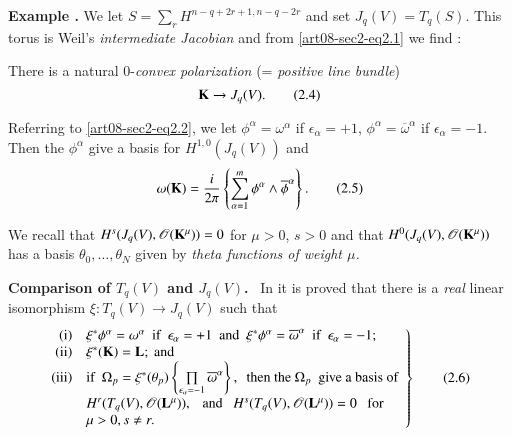 \medskip
\noindent
{\bf Example .\label{art08-exam2}}
We let $S=\sum\limits_{r} H^{n-q+2r+1,n-q-2r}$ and set $J_{q}(V)=T_{q}(S)$. This torus is Weil's {\em intermediate Jacobian} \cite{art08-key22} and from \eqref{art08-sec2-eq2.1} we find :
\smallskip

There is a natural $0$-{\em convex polarization} (= {\em positive line bundle})
\begin{equation*}
\mathbf{K}\to J_{q}(V).\tag{2.4}\label{art08-sec2-eq2.4}
\end{equation*}

Referring to \eqref{art08-sec2-eq2.2}, we let $\phi^{\alpha}=\omega^{\alpha}$ if $\epsilon_{\alpha}=+1$, $\phi^{\alpha}=\overline{\omega}^{\alpha}$ if $\epsilon_{\alpha}=-1$. Then the $\phi^{\alpha}$ give a basis for $H^{1,0}(J_{q}(V))$ and
\begin{equation*}
\omega (\mathbf{K})=\dfrac{i}{2\pi}\left\{\sum\limits^{m}_{\alpha=1}\phi^{\alpha}\wedge \overline{\phi}^{\alpha}\right\}.\tag{2.5}\label{art08-sec2-eq2.5}
\end{equation*}

We recall \cite{art08-key23} that $H^{s}(J_{q}(V),\mathscr{O}(\mathbf{K}^{\mu}))=0$ for $\mu>0$, $s>0$ and that $H^{0}(J_{q}(V),\mathscr{O}(\mathbf{K}^{\mu}))$ has a basis $\theta_{0},\ldots,\theta_{N}$ given by {\em theta functions of weight $\mu$.}

\medskip
\noindent
{\bf Comparison of \boldmath$T_{q}(V)$ and $J_{q}(V)$.}~ In \cite{art08-key9} it is proved that there is a {\em real} linear isomorphism $\xi:T_{q}(V)\to J_{q}(V)$ such that
\begin{equation*}
\left.
\begin{array}[l]{@{}rl}
{\rm(i)} & \xi^{*}\phi^{\alpha}=\omega^{\alpha}\text{~ if~ } \epsilon_{\alpha}=+1\text{~ and~ } \xi^{*}\phi^{\alpha}=\overline{\omega}^{\alpha}\text{~ if~ } \epsilon_{\alpha}=-1;\\
{\rm(ii)} & \xi^{*}(\bfK)=\bfL;~ \text{and}\\
{\rm(iii)} & \text{if~~} \Omega_{p}=\xi^{*}(\theta_{p})\left\{\prod\limits_{\epsilon_{\alpha}=-1}\overline{\omega}^{\alpha}\right\}, \text{~ then the } \Omega_{p}\text{~ give a basis of}\\
 & H^{r}(T_{q}(V),\mathscr{O}(\bfL^{\mu})),\text{~~ and~~ }H^{s}(T_{q}(V),\mathscr{O}(\bfL^{\mu}))=0\text{~~ for}\\
& \mu>0, s\neq r.
\end{array}
\right\}\tag{2.6}\label{art08-sec2-eq2.6}
\end{equation*}

